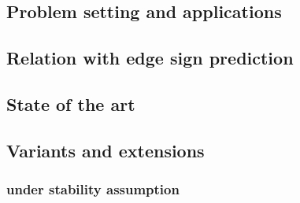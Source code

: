 
\subsection{Problem setting and applications}
\label{sub:problem_setting}


\subsection{Relation with edge sign prediction}
\label{sub:relation_with_edge_sign_prediction}


\subsection{State of the art}
\label{sub:state_of_the_art}



\subsection{Variants and extensions}
\label{sub:variants_and_extensions}


\subsubsection{\pcc{} under stability assumption}
\label{ssub:cc_under_stability_assumption}


\iffalse
\subsubsection{Parallel \pcc{}}
\label{ssub:parallel_cc}

\subsection{Empirical evaluation?}
\label{sub:cc_empiracal_evaluation}
\fi
